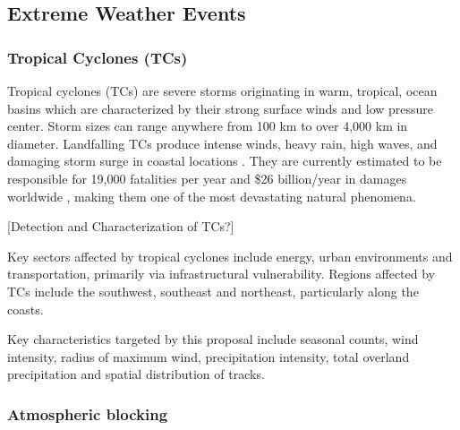 \documentclass[11pt]{article}
\begin{document}


\subsection{Extreme Weather Events} \label{sec:ExtremeWeather}

\subsubsection*{Tropical Cyclones (TCs)}

Tropical cyclones (TCs) are severe storms originating in warm, tropical, ocean basins which are characterized by their strong surface winds and low pressure center. Storm sizes can range anywhere from 100 km to over 4,000 km in diameter. Landfalling TCs produce intense winds, heavy rain, high waves, and damaging storm surge in coastal locations \citep{EmanuelDivineWind}. They are currently estimated to be responsible for 19,000 fatalities per year and \$26 billion/year in damages worldwide \citep{Mendelsohn2012}, making them one of the most devastating natural phenomena.


{\color{red}[Detection and Characterization of TCs?]}

Key sectors affected by tropical cyclones include energy, urban environments and transportation, primarily via infrastructural vulnerability.  Regions affected by TCs include the southwest, southeast and northeast, particularly along the coasts.

Key characteristics targeted by this proposal include seasonal counts, wind intensity, radius of maximum wind, precipitation intensity, total overland precipitation and spatial distribution of tracks.

\subsubsection*{Atmospheric blocking}
\end{document}
